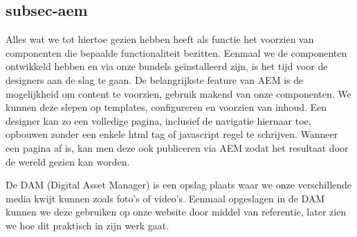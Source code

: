 \documentclass{article}
\begin{document}
	\subsection{subsec-aem}
	Alles wat we tot hiertoe gezien hebben heeft als functie het voorzien van componenten die bepaalde functionaliteit bezitten. Eenmaal we de componenten ontwikkeld hebben en via onze bundels geïnstalleerd zijn, is het tijd voor de designers aan de slag te gaan. De belangrijkste feature van AEM is de mogelijkheid om content te voorzien, gebruik makend van onze componenten. We kunnen deze slepen op templates, configureren en voorzien van inhoud. Een designer kan zo een volledige pagina, inclusief de navigatie hiernaar toe, opbouwen zonder een enkele html tag of javascript regel te schrijven. Wanneer een pagina af is, kan men deze ook publiceren via AEM zodat het resultaat door de wereld gezien kan worden.
	\par
	De DAM (Digital Asset Manager) is een opslag plaats waar we onze verschillende media kwijt kunnen zoals foto's of video's. Eenmaal opgeslagen in de DAM kunnen we deze gebruiken op onze website door middel van referentie, later zien we hoe dit praktisch in zijn werk gaat.
\end{document}
